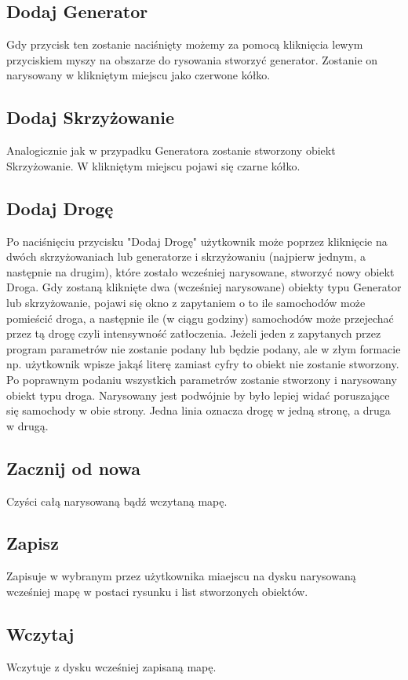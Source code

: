 \documentclass{article}
\begin{document}
\subsection{Dodaj Generator}
    Gdy przycisk ten zostanie naciśnięty możemy za pomocą kliknięcia lewym przyciskiem myszy na obszarze do rysowania stworzyć generator. Zostanie on narysowany w klikniętym miejscu jako czerwone kółko.

\subsection{Dodaj Skrzyżowanie}
    Analogicznie jak w przypadku Generatora zostanie stworzony obiekt Skrzyżowanie. W klikniętym miejscu pojawi się czarne kółko.

\subsection{Dodaj Drogę}
    Po naciśnięciu przycisku "Dodaj Drogę" użytkownik może poprzez kliknięcie na dwóch skrzyżowaniach lub generatorze i skrzyżowaniu (najpierw jednym, a następnie na drugim), które zostało wcześniej narysowane, stworzyć nowy obiekt Droga. Gdy zostaną kliknięte dwa (wcześniej narysowane) obiekty typu Generator lub skrzyżowanie, pojawi się okno z zapytaniem o to ile samochodów może pomieścić droga, a następnie ile (w ciągu godziny) samochodów może przejechać przez tą drogę czyli intensywność zatłoczenia. Jeżeli jeden z zapytanych przez program parametrów nie zostanie podany lub będzie podany, ale w złym formacie np. użytkownik wpisze jakąś literę zamiast cyfry to obiekt nie zostanie stworzony. Po poprawnym podaniu wszystkich parametrów zostanie stworzony i narysowany obiekt typu droga. Narysowany jest podwójnie by było lepiej widać poruszające się samochody w obie strony. Jedna linia oznacza drogę w jedną stronę, a druga w drugą.

\subsection{Zacznij od nowa}
    Czyści całą narysowaną bądź wczytaną mapę.

\subsection{Zapisz}
    Zapisuje w wybranym przez użytkownika miaejscu na dysku narysowaną wcześniej mapę w postaci rysunku i list stworzonych obiektów.

\subsection{Wczytaj}
    Wczytuje z dysku wcześniej zapisaną mapę.
\end{document}
